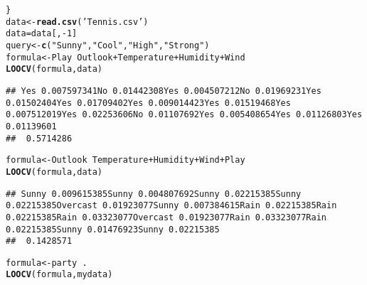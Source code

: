 \documentclass{article}\usepackage[]{graphicx}\usepackage[]{color}
\makeatletter
\newcommand{\hlnum}[1]{\textcolor[rgb]{0.686,0.059,0.569}{#1}}%
\newcommand{\hlstr}[1]{\textcolor[rgb]{0.192,0.494,0.8}{#1}}%
\newcommand{\hlopt}[1]{\textcolor[rgb]{0,0,0}{#1}}%
\newcommand{\hlstd}[1]{\textcolor[rgb]{0.345,0.345,0.345}{#1}}%
\newcommand{\hlkwb}[1]{\textcolor[rgb]{0.69,0.353,0.396}{#1}}%
\newcommand{\hlkwd}[1]{\textcolor[rgb]{0.737,0.353,0.396}{\textbf{#1}}}%
\newenvironment{kframe}{%
 \def\at@end@of@kframe{}%
 \ifinner\ifhmode%
  \def\at@end@of@kframe{\end{minipage}}%
  \begin{minipage}{\columnwidth}%
 \fi\fi%
 \def\FrameCommand##1{\hskip\@totalleftmargin \hskip-\fboxsep
 \colorbox{shadecolor}{##1}\hskip-\fboxsep
     \hskip-\linewidth \hskip-\@totalleftmargin \hskip\columnwidth}%
 \MakeFramed {\advance\hsize-\width
   \@totalleftmargin\z@ \linewidth\hsize
   \@setminipage}}%
 {\par\unskip\endMakeFramed%
 \at@end@of@kframe}
\newenvironment{knitrout}{}{} %
\makeatother
\begin{document}
\begin{enumerate}
\begin{knitrout}
\begin{kframe}
\begin{alltt}
\hlstd{\}}
\hlstd{data} \hlkwb{<-}\hlkwd{read.csv}\hlstd{(}\hlstr{'Tennis.csv'}\hlstd{)}
\hlstd{data} \hlkwb{=} \hlstd{data[,}\hlopt{-}\hlnum{1}\hlstd{]}
\hlstd{query} \hlkwb{<-} \hlkwd{c}\hlstd{(}\hlstr{"Sunny"}\hlstd{,} \hlstr{"Cool"}\hlstd{,} \hlstr{"High"}\hlstd{,} \hlstr{"Strong"}\hlstd{)}
\hlstd{formula} \hlkwb{<-} \hlstd{Play} \hlopt{~} \hlstd{Outlook} \hlopt{+} \hlstd{Temperature} \hlopt{+} \hlstd{Humidity} \hlopt{+} \hlstd{Wind}
 \hlkwd{LOOCV}\hlstd{(formula, data)}
\end{alltt}
\begin{verbatim}
## Yes 0.007597341No 0.01442308Yes 0.004507212No 0.01969231Yes 0.01502404Yes 0.01709402Yes 0.009014423Yes 0.01519468Yes 0.007512019Yes 0.02253606No 0.01107692Yes 0.005408654Yes 0.01126803Yes 0.01139601
##  0.5714286
\end{verbatim}
\begin{alltt}
 \hlstd{formula} \hlkwb{<-} \hlstd{Outlook} \hlopt{~} \hlstd{Temperature} \hlopt{+} \hlstd{Humidity} \hlopt{+} \hlstd{Wind} \hlopt{+} \hlstd{Play}
 \hlkwd{LOOCV}\hlstd{(formula,data)}
\end{alltt}
\begin{verbatim}
## Sunny 0.009615385Sunny 0.004807692Sunny 0.02215385Sunny 0.02215385Overcast 0.01923077Sunny 0.007384615Rain 0.02215385Rain 0.02215385Rain 0.03323077Overcast 0.01923077Rain 0.03323077Rain 0.02215385Sunny 0.01476923Sunny 0.02215385
##  0.1428571
\end{verbatim}
\begin{alltt}
 \hlstd{formula} \hlkwb{<-} \hlstd{party} \hlopt{~}\hlstd{.}
 \hlkwd{LOOCV}\hlstd{(formula,mydata)}
\end{alltt}
\begin{verbatim}

\end{verbatim}
\end{kframe}
\end{knitrout}
\end{enumerate}
\end{document}
